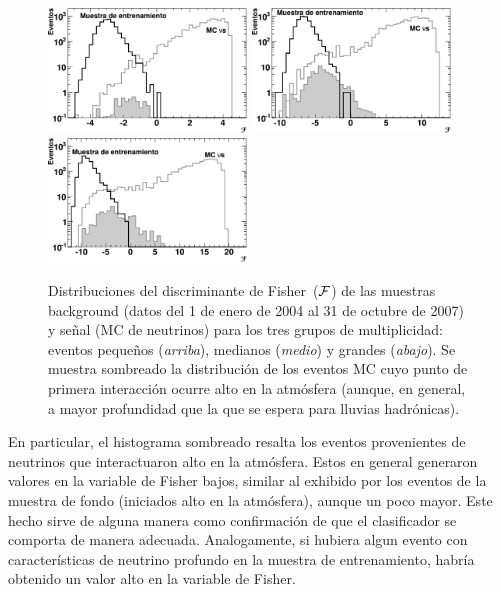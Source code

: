 	\begin{figure}
	\begin{center}
	\includegraphics [width=0.47\textwidth]{fig/seleccionAuger/fishDist_altos_1.pdf}\hfill
	\includegraphics [width=0.47\textwidth]{fig/seleccionAuger/fishDist_altos_2.pdf}\\
	\includegraphics [width=0.47\textwidth]{fig/seleccionAuger/fishDist_altos_3.pdf}
	\end{center}
	\caption{
	Distribuciones del discriminante de Fisher~($\cal{F}$) de las muestras background (datos del 1 de enero de 2004 al 31 de octubre de 2007) y señal (MC de neutrinos) para los tres grupos de multiplicidad: eventos pequeños (\textit{arriba}), medianos (\textit{medio}) y grandes (\textit{abajo}). Se muestra sombreado la distribución de los eventos MC cuyo punto de primera interacción ocurre alto en la atmósfera (aunque, en general, a mayor profundidad que la que se espera para lluvias hadrónicas).
	}
	\label{fig:fisherDGH}
	\end{figure}
	En particular, el histograma sombreado resalta los eventos provenientes de neutrinos que interactuaron alto en la atmósfera.
	Estos en general generaron valores en la variable de Fisher bajos, similar al exhibido por los eventos de la muestra de fondo (iniciados alto en la atmósfera), aunque un poco mayor.
	Este hecho sirve de alguna manera como confirmación de que el clasificador se comporta de manera adecuada. 
	Analogamente, si hubiera algun evento con características de neutrino profundo en la muestra de entrenamiento, habría obtenido un valor alto en la variable de Fisher.
	
